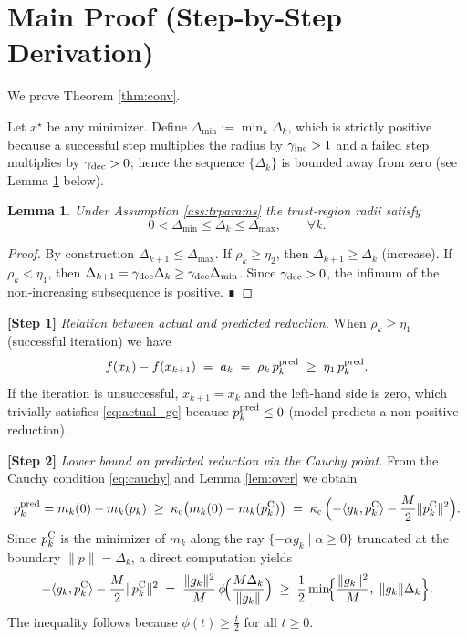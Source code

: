 \documentclass{article}
\newtheorem{lemma}{Lemma}
\begin{document}
\section*{Main Proof (Step‑by‑Step Derivation)}
We prove Theorem \ref{thm:conv}.  

Let $x^\star$ be any minimizer. Define $\Delta_{\min}:=\min_{k}\Delta_k$, which is strictly positive because a successful step multiplies the radius by $\gamma_{\rm inc}>1$ and a failed step multiplies by $\gamma_{\rm dec}>0$; hence the sequence $\{\Delta_k\}$ is bounded away from zero (see Lemma \ref{lem:radius} below).

\begin{lemma}
\label{lem:radius}
Under Assumption \ref{ass:trparams} the trust‑region radii satisfy
\[
0<\Delta_{\min}\le \Delta_k\le \Delta_{\max},\qquad\forall k.
\]
\end{lemma}
\begin{proof}
By construction $\Delta_{k+1}\le\Delta_{\max}$.  
If $\rho_k\ge\eta_2$, then $\Delta_{k+1}\ge \Delta_k$ (increase).  
If $\rho_k<\eta_1$, then $\Delta_{k+1}= \gamma_{\rm dec}\Delta_k\ge \gamma_{\rm dec}\Delta_{\min}$.
Since $\gamma_{\rm dec}>0$, the infimum of the non‑increasing subsequence is positive. ∎
\end{proof}

\noindent\textbf{[Step 1]} \emph{Relation between actual and predicted reduction.}  
When $\rho_k\ge\eta_1$ (successful iteration) we have
\begin{equation}
\label{eq:actual_ge}
f(x_k)-f(x_{k+1}) \;=\; a_k \;=\; \rho_k\,p_k^{\rm pred}
\;\ge\; \eta_1\,p_k^{\rm pred}.
\end{equation}
If the iteration is unsuccessful, $x_{k+1}=x_k$ and the left‑hand side is zero, which trivially satisfies \eqref{eq:actual_ge} because $p_k^{\rm pred}\le0$ (model predicts a non‑positive reduction).

\noindent\textbf{[Step 2]} \emph{Lower bound on predicted reduction via the Cauchy point.}  
From the Cauchy condition \eqref{eq:cauchy} and Lemma \ref{lem:over} we obtain
\[
p_k^{\rm pred}=m_k(0)-m_k(p_k)
\;\ge\; \kappa_{\rm c}\bigl(m_k(0)-m_k(p^{\rm C}_k)\bigr)
\;=\; \kappa_{\rm c}\, \Bigl(-\langle g_k,p^{\rm C}_k\rangle-\frac{M}{2}\|p^{\rm C}_k\|^2\Bigr).
\]
Since $p^{\rm C}_k$ is the minimizer of $m_k$ along the ray $\{-\alpha g_k\mid \alpha\ge0\}$ truncated at the boundary $\|p\|=\Delta_k$, a direct computation yields
\begin{equation}
\label{eq:cauchy_reduction}
-\langle g_k,p^{\rm C}_k\rangle-\frac{M}{2}\|p^{\rm C}_k\|^2
\;=\; \frac{\|g_k\|^2}{M}\,\phi\!\Bigl(\frac{M\Delta_k}{\|g_k\|}\Bigr)
\;\ge\; \frac{1}{2}\min\!\Bigl\{\frac{\|g_k\|^2}{M},\; \|g_k\|\Delta_k\Bigr\}.
\end{equation}
The inequality follows because $\phi(t)\ge \frac{t}{2}$ for all $t\ge0$.
\end{document}

